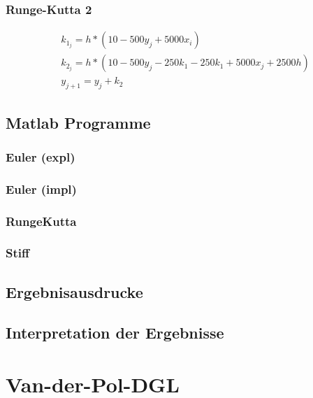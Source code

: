 \documentclass[10pt]{scrartcl}
\begin{document}
		\subsubsection{Runge-Kutta 2}
		\begin{align}
		&k_{1_{j}} = h * (10-500y_j + 5000x_i)\\
		&k_{2_{j}} = h * (10-500y_j - 250k_{1} - 250k_{1} + 5000x_{j}+2500h)\\
		&y_{j+1} = y_j + k_2
		\end{align}			
		
	\subsection{Matlab Programme}
		\subsubsection{Euler (expl)}
			
		
		\subsubsection{Euler (impl)}
			
		
		\subsubsection{Runge\-Kutta}
			
		
		\subsubsection{Stiff}		
					
			
	\subsection{Ergebnisausdrucke}	
		
	\subsection{Interpretation der Ergebnisse}		
		

\section{Van-der-Pol-DGL}
\end{document}

